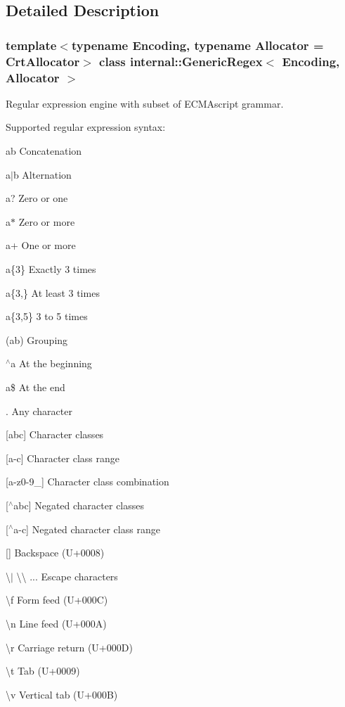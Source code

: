 \subsection{Detailed Description}
\subsubsection*{template$<$typename Encoding, typename Allocator = Crt\+Allocator$>$\newline
class internal\+::\+Generic\+Regex$<$ Encoding, Allocator $>$}

Regular expression engine with subset of E\+C\+M\+Ascript grammar. 

Supported regular expression syntax\+:
\begin{DoxyItemize}
\item {\ttfamily ab} Concatenation
\item {\ttfamily a$\vert$b} Alternation
\item {\ttfamily a}? Zero or one
\item {\ttfamily a$\ast$} Zero or more
\item {\ttfamily a+} One or more
\item {\ttfamily a\{3\}} Exactly 3 times
\item {\ttfamily a\{3},\} At least 3 times
\item {\ttfamily a\{3},5\} 3 to 5 times
\item {\ttfamily }(ab) Grouping
\item {\ttfamily $^\wedge$a} At the beginning
\item {\ttfamily a\$} At the end
\item {\ttfamily }. Any character
\item {\ttfamily }\mbox{[}abc\mbox{]} Character classes
\item {\ttfamily }\mbox{[}a-\/c\mbox{]} Character class range
\item {\ttfamily }\mbox{[}a-\/z0-\/9\+\_\+\mbox{]} Character class combination
\item {\ttfamily }\mbox{[}$^\wedge$abc\mbox{]} Negated character classes
\item {\ttfamily }\mbox{[}$^\wedge$a-\/c\mbox{]} Negated character class range
\item {\ttfamily }\mbox{[}{\bfseries }\mbox{]} Backspace (U+0008)
\item {\ttfamily \textbackslash{}}$\vert$ \textbackslash{}\textbackslash{} ... Escape characters
\item {\ttfamily \textbackslash{}f} Form feed (U+000C)
\item {\ttfamily \textbackslash{}n} Line feed (U+000A)
\item {\ttfamily \textbackslash{}r} Carriage return (U+000D)
\item {\ttfamily \textbackslash{}t} Tab (U+0009)
\item {\ttfamily \textbackslash{}v} Vertical tab (U+000B)
\end{DoxyItemize}

